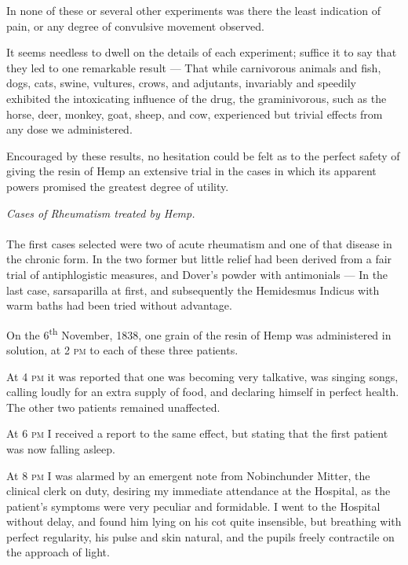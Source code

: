 \documentclass[a4paper, 11pt, oneside, polutonikogreek, english]{article}
\begin{document}
In none of these or several other experiments was there the least indication of pain, or any degree of convulsive movement observed.

It seems needless to dwell on the details of each experiment; suffice it to say that they led to one remarkable result --- That while carnivorous animals and fish, dogs, cats, swine, vultures, crows, and adjutants, invariably and speedily exhibited the intoxicating influence of the drug, the graminivorous, such as the horse, deer, monkey, goat, sheep, and cow, experienced but trivial effects from any dose we administered.

Encouraged by these results, no hesitation could be felt as to the perfect safety of giving the resin of Hemp an extensive trial in the cases in which its apparent powers promised the greatest degree of utility.
\begin{center}
\emph{Cases of Rheumatism treated by Hemp.}
\end{center}
\paragraph{}
The first cases selected were two of acute rheumatism and one of that disease in the chronic form. In the two former but little relief had been derived from a fair trial of antiphlogistic measures, and Dover's powder with antimonials --- In the last case, sarsaparilla at first, and subsequently the Hemidesmus Indicus with warm baths had been tried without advantage.

On the 6\textsuperscript{th} November, 1838, one grain of the resin of Hemp was administered in solution, at 2 \textsc{pm} to each of these three patients.

At 4 \textsc{pm} it was reported that one was becoming very talkative, was singing songs, calling loudly for an extra supply of food, and declaring himself in perfect health. The other two patients remained unaffected.

At 6 \textsc{pm} I received a report to the same effect, but stating that the first patient was now falling asleep.

At 8 \textsc{pm} I was alarmed by an emergent note from Nobinchunder Mitter, the clinical clerk on duty, desiring my immediate attendance at the Hospital, as the patient's symptoms were very peculiar and formidable. I went to the Hospital without delay, and found him lying on his cot quite insensible, but breathing with perfect regularity, his pulse and skin natural, and the pupils freely contractile on the approach of light.
\end{document}

